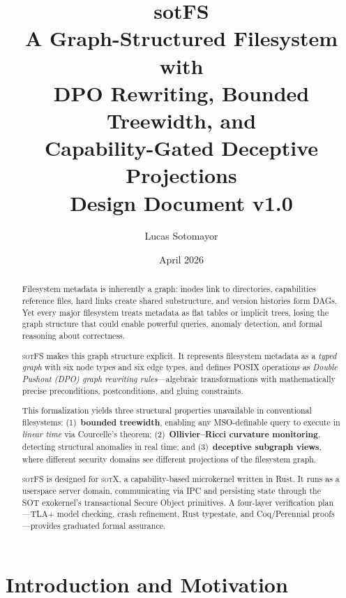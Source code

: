 \documentclass[11pt,a4paper]{article}
\title{
  \vspace{-1.5cm}
  \textbf{sotFS} \\[0.4em]
  \large A Graph-Structured Filesystem with \\
  DPO Rewriting, Bounded Treewidth, and \\
  Capability-Gated Deceptive Projections \\[0.6em]
  \normalsize Design Document v1.0
}
\author{
  Lucas Sotomayor
}
\date{April 2026}
\theoremstyle{definition}
\newcommand{\sotfs}{\textsc{sotFS}}
\newcommand{\sotos}{\textsc{sotX}}
\begin{document}

\maketitle
\thispagestyle{empty}

\begin{abstract}
\noindent
Filesystem metadata is inherently a graph: inodes link to directories,
capabilities reference files, hard links create shared substructure, and
version histories form DAGs. Yet every major filesystem treats metadata as
flat tables or implicit trees, losing the graph structure that could enable
powerful queries, anomaly detection, and formal reasoning about correctness.

\sotfs{} makes this graph structure explicit. It represents filesystem
metadata as a \emph{typed graph} with six node types and six edge types,
and defines POSIX operations as \emph{Double Pushout (DPO) graph rewriting
rules}---algebraic transformations with mathematically precise preconditions,
postconditions, and gluing constraints.

This formalization yields three structural properties unavailable in
conventional filesystems: (1)~\textbf{bounded treewidth}, enabling any
MSO-definable query to execute in \emph{linear time} via Courcelle's
theorem; (2)~\textbf{Ollivier--Ricci curvature monitoring}, detecting
structural anomalies in real time; and (3)~\textbf{deceptive subgraph
views}, where different security domains see different projections of the
filesystem graph.

\sotfs{} is designed for \sotos{}, a capability-based microkernel written
in Rust. It runs as a userspace server domain, communicating via IPC and
persisting state through the SOT exokernel's transactional Secure Object
primitives. A four-layer verification plan---TLA+ model checking, crash
refinement, Rust typestate, and Coq/Perennial proofs---provides graduated
formal assurance.
\end{abstract}

\tableofcontents
\newpage

\section{Introduction and Motivation}
\end{document}
